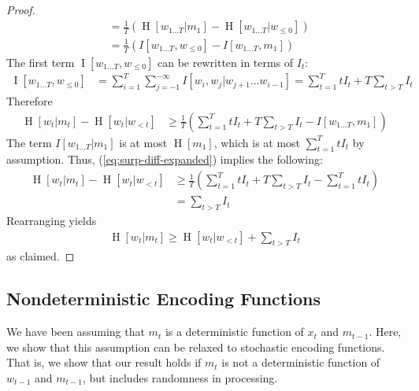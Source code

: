 \documentclass[11pt,letterpaper]{article}
\begin{document}
\begin{proof}
\begin{align}
& = \frac{1}{T} \left(\operatorname{H}[w_{1\dots T} | m_1] - \operatorname{H}[w_{1\dots T} | w_{\leq 0}]\right)  \\
& = \frac{1}{T} \left(I[w_{1\dots T}, w_{\leq 0}] - I[w_{1\dots T}, m_1]\right) 
\end{align}
	The first term $\operatorname{I}[w_{1\dots T}, w_{\leq 0}]$ can be rewritten in terms of $I_t$:
\begin{align}\label{eq:i-expanded}
	\operatorname{I}[w_{1\dots T}, w_{\leq 0}] &= \sum_{i=1}^T \sum_{j=-1}^{-\infty} I[w_i, w_j | w_{j+1}...w_{i-1}] = \sum_{t=1}^T t I_t + T \sum_{t > T} I_t
\end{align}
Therefore
\begin{align}\label{eq:surp-diff-expanded}
\operatorname{H}[w_t | m_t] - \operatorname{H}[w_t | w_{<t}]& \geq \frac{1}{T} \left(\sum_{t=1}^T t I_t + T \sum_{t > T} I_t - I[w_{1\dots T}, m_1]\right) 
\end{align}
The term $I[w_{1\dots T}|m_1]$ is at most $\operatorname{H}[m_1]$, which is at most $\sum_{t=1}^T t I_t$ by assumption. Thus,  (\ref{eq:surp-diff-expanded}) implies the following:
\begin{align*}
\operatorname{H}[w_t | m_t] - \operatorname{H}[w_t | w_{<t}]& \geq \frac{1}{T} \left(\sum_{t=1}^T t I_t + T \sum_{t > T} I_t - \sum_{t=1}^T t I_t\right) \\
&= \sum_{t > T} I_t
\end{align*}
Rearranging yields
\begin{align}
\operatorname{H}[w_t|m_t] \geq \operatorname{H}[w_t | w_{<t}] + \sum_{t > T} I_t
\end{align}
as claimed.
\end{proof}





\subsection{Nondeterministic Encoding Functions}

We have been assuming that $m_t$ is a deterministic function of $x_t$ and $m_{t-1}$.
Here, we show that this assumption can be relaxed to stochastic encoding functions.
That is, we show that our result holds if
$m_t$ is not a deterministic function of $w_{t-1}$ and $m_{t-1}$, but includes randomness in processing.
\end{document}
